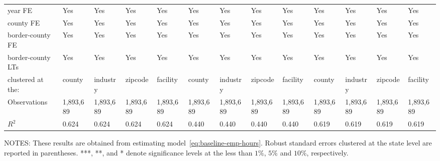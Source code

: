 \begin{table}[H]
{\begin{tabular}{@{}lllllllllllll@{}}
            year FE              & Yes       & Yes       & Yes       & Yes       & Yes       & Yes       & Yes       & Yes       & Yes       & Yes       & Yes       & Yes       \\
            county FE            & Yes       & Yes       & Yes       & Yes       & Yes       & Yes       & Yes       & Yes       & Yes       & Yes       & Yes       & Yes       \\
            border-county FE     & Yes       & Yes       & Yes       & Yes       & Yes       & Yes       & Yes       & Yes       & Yes       & Yes       & Yes       & Yes       \\
            border-county LTs    & Yes       & Yes       & Yes       & Yes       & Yes       & Yes       & Yes       & Yes       & Yes       & Yes       & Yes       & Yes       \\\midrule
            clustered at the:    & county    & industry  & zipcode   & facility  & county    & industry  & zipcode   & facility  & county    & industry  & zipcode   & facility  \\
            Observations         & 1,893,689 & 1,893,689 & 1,893,689 & 1,893,689 & 1,893,689 & 1,893,689 & 1,893,689 & 1,893,689 & 1,893,689 & 1,893,689 & 1,893,689 & 1,893,689 \\
            $R^2$                & 0.624     & 0.624     & 0.624     & 0.624     & 0.440     & 0.440     & 0.440     & 0.440     & 0.619     & 0.619     & 0.619     & 0.619     \\ \bottomrule \bottomrule
        \end{tabular}%
    }
    \begin{minipage}{\columnwidth}
        \vspace{0.05in}
        \tiny NOTES: These results are obtained from estimating model~\ref{eq:baseline-emp-hours}. Robust standard errors clustered at the state level are reported in parentheses. ***, **, and * denote significance levels at the less than $1\%$, $5\%$ and $10\%$, respectively.
    \end{minipage}
\end{table}